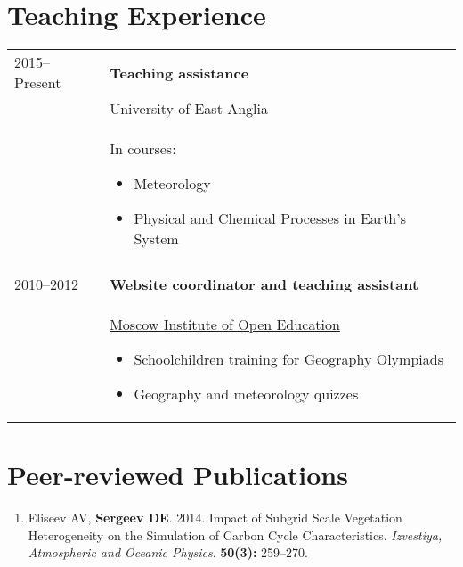 \documentclass[a4paper,11pt]{article}
\makeatletter
\newlength{\mycol}
\newlength{\bibhang}
\newlength{\bibsep}
 {\@listi \global\bibsep\itemsep \global\advance\bibsep by\parsep}
\newenvironment{bibsection}%
        {\begin{enumerate}{}{%
       \setlength{\leftmargin}{\bibhang}%
       \setlength{\itemindent}{-\leftmargin}%
       \setlength{\itemsep}{\bibsep}%
       \setlength{\parsep}{\z@}%
        \setlength{\partopsep}{0pt}%
        \setlength{\topsep}{0pt}}}
        {\end{enumerate}\vspace{-.6\baselineskip}}
\makeatother
\begin{document}
\section{Teaching Experience}
\begin{tabu} to 
2015--\small{Present} & \textbf{Teaching assistance} \\
& University of East Anglia \\
& In courses: 
\begin{itemize}
\item Meteorology
\item Physical and Chemical Processes in Earth's System
\end{itemize} \\
 \\

2010--2012 & \textbf{Website coordinator and teaching assistant} \\
& \href{http://www.mioo.ru/}{Moscow Institute of Open Education} 
\begin{itemize}
\item Schoolchildren training for Geography Olympiads
\item Geography and meteorology quizzes
\end{itemize}
\end{tabu}

\section{Peer-reviewed Publications}
\begin{bibsection}
    \item Eliseev AV, {\bf Sergeev DE}. 2014. Impact of Subgrid Scale Vegetation Heterogeneity on the Simulation of Carbon Cycle Characteristics. \emph{Izvestiya, Atmospheric and Oceanic Physics}. \textbf{50(3):} 259--270.
\end{bibsection}
\end{document}
